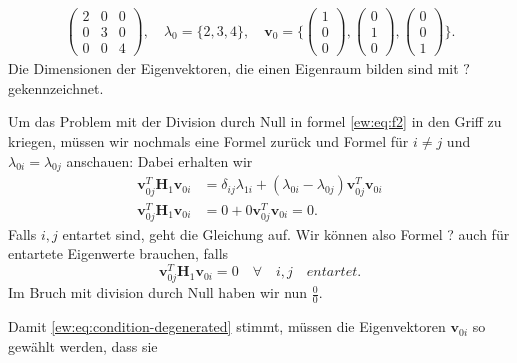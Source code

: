 \begin{align}
    \begin{pmatrix}
        2 & 0 & 0\\
        0 & 3 & 0\\
        0 & 0 & 4
    \end{pmatrix},
    \quad
    \lambda_0 = \{2, 3, 4\},
    \quad
    \bm v_0 = \{
    \begin{pmatrix}
        1\\
        0\\
        0
    \end{pmatrix},
    \begin{pmatrix}
        0\\
        1\\
        0
    \end{pmatrix},
    \begin{pmatrix}
        0\\
        0\\
        1
    \end{pmatrix}
    \}.
\end{align}
Die Dimensionen der Eigenvektoren, die einen Eigenraum bilden sind mit $?$ gekennzeichnet. %


Um das Problem mit der Division durch Null in formel \ref{ew:eq:f2} in den Griff zu kriegen, müssen wir nochmals eine Formel zurück und Formel \label{ew:eq:f} für $i \neq j$ und $\lambda_{0i} = \lambda_{0j}$ anschauen:
Dabei erhalten wir
\begin{align}
    \bm v_{0j}^T \bm H_1 \bm v_{0i}
    &=
    \delta_{ij} \lambda_{1i} + 
    ( \lambda_{0i} - \lambda_{0j} )
    \bm v_{0j}^T  \bm v_{0i}
    \\
    \bm v_{0j}^T \bm H_1 \bm v_{0i}
    &=
    0 +
    0
    \bm v_{0j}^T  \bm v_{0i}
    = 0.
\end{align}
Falls $i, j$ entartet sind, geht die Gleichung auf. Wir können also Formel ? auch für entartete Eigenwerte brauchen, falls %
\begin{equation}
    \bm v_{0j}^T \bm H_1 \bm v_{0i} = 0 \quad \forall \quad i,j \quad entartet.
\end{equation} \label{ew:eq:condition-degenerated}
Im Bruch mit division durch Null haben wir nun $\frac{0}{0}$.

Damit \ref{ew:eq:condition-degenerated} stimmt, müssen die Eigenvektoren $\bm v_{0i}$ so gewählt werden, dass sie %

